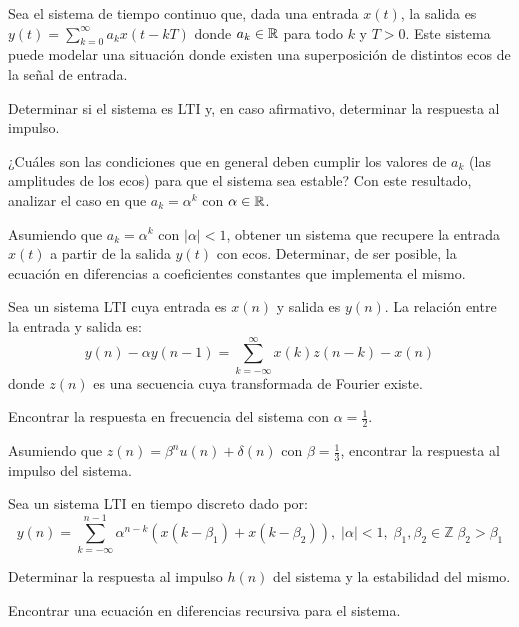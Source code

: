 \begin{ejercicio}
    Sea el sistema de tiempo continuo que, dada una entrada $x(t)$, la salida es $y(t) = \sum_{k=0}^{\infty} a_k x(t-kT)$ donde $a_k \in \mathbb{R}$ para todo $k$ y $T>0$. Este sistema puede modelar una situación donde existen una superposición de distintos ecos de la señal de entrada.

    \inciso Determinar si el sistema es LTI y, en caso afirmativo, determinar la respuesta al impulso.

    \inciso ¿Cuáles son las condiciones que en general deben cumplir los valores de $a_k$ (las amplitudes de
    los ecos) para que el sistema sea estable? Con este resultado, analizar el caso en que $a_k = \alpha^k$ con $\alpha \in \mathbb{R}$.

    \inciso Asumiendo que $a_k = \alpha^k$ con $|\alpha| < 1$, obtener un sistema que recupere la entrada $x(t)$ a partir de la salida $y(t)$ con ecos. Determinar, de ser posible, la ecuación en diferencias a coeficientes constantes que implementa el mismo. 
\end{ejercicio}

\begin{ejercicio}
    Sea un sistema LTI cuya entrada es $x(n)$ y salida es $y(n)$. La relación entre la entrada y salida es:
    \begin{equation*}
        y(n) - \alpha y(n-1) = \sum_{k=-\infty}^{\infty} x(k) z(n-k) - x(n)
    \end{equation*}
    donde $z(n)$ es una secuencia cuya transformada de Fourier existe. 

    \inciso Encontrar la respuesta en frecuencia del sistema con $\alpha = \frac{1}{2}$. 

    \inciso Asumiendo que $z(n) = \beta^n u(n) + \delta(n)$ con $\beta = \frac{1}{3}$, encontrar la respuesta al impulso del sistema.
\end{ejercicio}

\begin{ejercicio}
    Sea un sistema LTI en tiempo discreto dado por:
    \begin{equation*}
        y(n) = \sum_{k=-\infty}^{n-1} \alpha^{n-k} \left( x(k - \beta_1) + x(k - \beta_2) \right),\; |\alpha| < 1, \; \beta_1, \beta_2 \in \mathbb{Z}\; \beta_2 > \beta_1
    \end{equation*}

    \inciso Determinar la respuesta al impulso $h(n)$ del sistema y la estabilidad del mismo. 

    \inciso Encontrar una ecuación en diferencias recursiva para el sistema.
\end{ejercicio}

